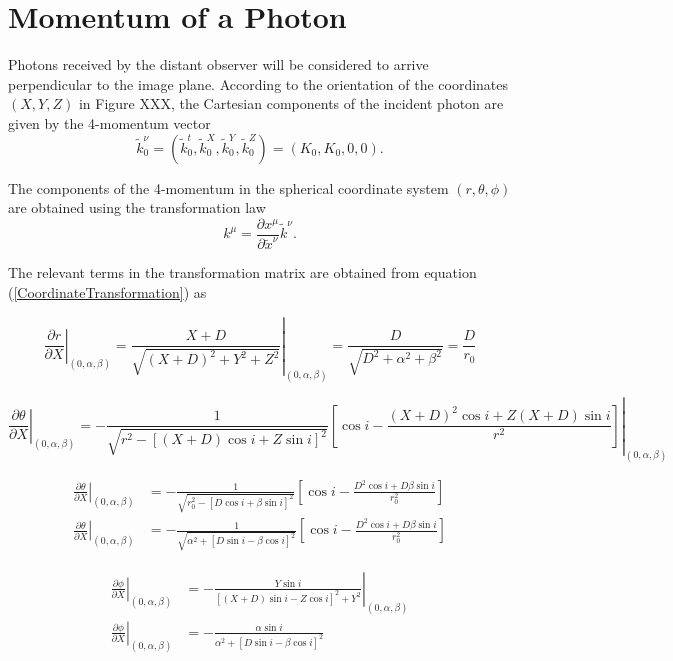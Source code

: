 \section{Momentum of a Photon}

Photons received by the distant observer will be considered to arrive perpendicular to the image plane. According to the orientation of the coordinates $(X,Y,Z)$ in Figure XXX, the Cartesian components of the incident photon are given by the 4-momentum vector
\begin{equation}
\tilde{k}^\nu_0 =\left( \tilde{k}^t_0, \tilde{k}^X_0, \tilde{k}^Y_0, \tilde{k}^Z_0 \right) = \left( K_0, K_0, 0, 0 \right).
\end{equation}

The components of the 4-momentum in the spherical coordinate system $(r,\theta,\phi)$ are obtained using the transformation law
\begin{equation}
k^\mu = \frac{\partial x^\mu}{\partial \tilde{x}^\nu} \tilde{k}^\nu.
\end{equation}

The relevant terms in the transformation matrix are obtained from equation (\ref{CoordinateTransformation}) as

\begin{equation}
\left. \frac{\partial r}{\partial X} \right|_{(0,\alpha,\beta)}= \left.\frac{X+D}{\sqrt{(X+D)^2 + Y^2 + Z^2}}\right|_{(0,\alpha,\beta)}
= \frac{D}{\sqrt{D^2 + \alpha^2 + \beta^2}} = \frac{D}{r_0}
\end{equation}

\footnotesize
\begin{equation}
\left. \frac{\partial \theta}{\partial X} \right|_{(0,\alpha,\beta)} = \left.-\frac{1}{\sqrt{r^2-[(X+D)\cos i + Z \sin i]^2}}  \left[ \cos i - \frac{(X+D)^2 \cos i + Z(X+D) \sin i}{r^2}\right]\right|_{(0,\alpha,\beta)} \nonumber
\end{equation}
\normalsize

\begin{align}
\left. \frac{\partial \theta}{\partial X} \right|_{(0,\alpha,\beta)} &= -\frac{1}{\sqrt{r^2_0 -[D\cos i + \beta \sin i]^2}}  \left[ \cos i - \frac{D^2 \cos i + D\beta \sin i}{r^2_0}\right]\\
\left. \frac{\partial \theta}{\partial X} \right|_{(0,\alpha,\beta)} &= -\frac{1}{\sqrt{\alpha^2 +[D\sin i - \beta \cos i]^2}}  \left[ \cos i - \frac{D^2 \cos i + D\beta \sin i}{r^2_0}\right]
\end{align}


\begin{align}
\left. \frac{\partial \phi}{\partial X} \right|_{(0,\alpha,\beta)} &= \left.-\frac{Y \sin i}{[(X+D)\sin i - Z \cos i ]^2 + Y^2 } \right|_{(0,\alpha,\beta)} \nonumber \\
\left. \frac{\partial \phi}{\partial X} \right|_{(0,\alpha,\beta)} &= -\frac{\alpha \sin i}{\alpha^2 +[D \sin i - \beta \cos i]^2 }  
\end{align}

